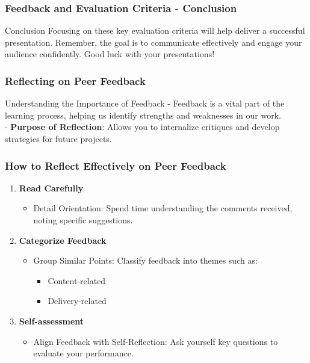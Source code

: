 \documentclass[aspectratio=169]{beamer}
\begin{document}
\begin{frame}[fragile]
    \frametitle{Feedback and Evaluation Criteria - Conclusion}
    \begin{block}{Conclusion}
        Focusing on these key evaluation criteria will help deliver a successful presentation. Remember, the goal is to communicate effectively and engage your audience confidently. Good luck with your presentations!
    \end{block}
\end{frame}

\begin{frame}[fragile]
    \frametitle{Reflecting on Peer Feedback}
    \begin{block}{Understanding the Importance of Feedback}
        - Feedback is a vital part of the learning process, helping us identify strengths and weaknesses in our work. \\
        - \textbf{Purpose of Reflection}: Allows you to internalize critiques and develop strategies for future projects.
    \end{block}
\end{frame}

\begin{frame}[fragile]
    \frametitle{How to Reflect Effectively on Peer Feedback}
    \begin{enumerate}
        \item \textbf{Read Carefully}
        \begin{itemize}
            \item Detail Orientation: Spend time understanding the comments received, noting specific suggestions.
        \end{itemize}

        \item \textbf{Categorize Feedback}
        \begin{itemize}
            \item Group Similar Points: Classify feedback into themes such as:
            \begin{itemize}
                \item Content-related
                \item Delivery-related
            \end{itemize}
        \end{itemize}

        \item \textbf{Self-assessment}
        \begin{itemize}
            \item Align Feedback with Self-Reflection: Ask yourself key questions to evaluate your performance.
        \end{itemize}
    \end{enumerate}
\end{frame}
\end{document}
